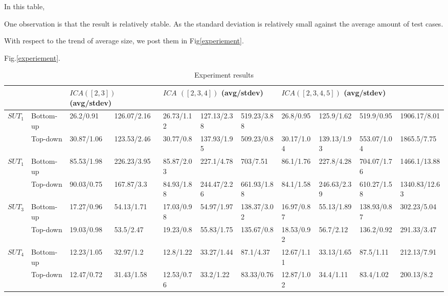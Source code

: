 \documentclass[conference]{IEEEtran}
\theoremstyle{definition}
\begin{document}
In this table, 


One observation is that the result is relatively stable. As the standard deviation is relatively small against the average amount of test cases.

With respect to the trend of average size, we post them in Fig\ref{experiement}.

 Fig.\ref{experiement}.

\begin{table}[h]
  \centering
  \caption{Experiment results}
  \label{experiment_table}
\begin{tabular}{|l|l|ll|lll|llll|}
\hline
\multicolumn{2}{|l|}{}            & \multicolumn{2}{l|}{$ICA([2, 3])$ (avg/stdev)}& \multicolumn{3}{l|}{$ICA$ $([2, 3,4])$ (avg/stdev)}    & \multicolumn{4}{l|}{$ICA([2, 3,4,5])$ (avg/stdev) }                   \\ \hline
\multirow{2}{*}{$SUT_{1}$} & Bottom-up & 26.2/0.91        & 126.07/2.16      & 26.73/1.12 & 127.13/2.38 & 519.23/3.88 & 26.8/0.95  & 125.9/1.62  & 519.9/0.95  & 1906.17/8.01  \\
                      & Top-down  & 30.87/1.06       & 123.53/2.46      & 30.77/0.8  & 137.93/1.95 & 509.23/0.8  & 30.17/1.04 & 139.13/1.93 & 553.07/1.04 & 1865.5/7.75   \\ \hline
\multirow{2}{*}{$SUT_{1}$} & Bottom-up & 85.53/1.98       & 226.23/3.95      & 85.87/2.03 & 227.1/4.78  & 703/7.51    & 86.1/1.76  & 227.8/4.28  & 704.07/1.76 & 1466.1/13.88  \\
                      & Top-down  & 90.03/0.75       & 167.87/3.3       & 84.93/1.88 & 244.47/2.26 & 661.93/1.88 & 84.1/1.58  & 246.63/2.39 & 610.27/1.58 & 1340.83/12.63 \\ \hline
\multirow{2}{*}{$SUT_{3}$} & Bottom-up & 17.27/0.96       & 54.13/1.71       & 17.03/0.98 & 54.97/1.97  & 138.37/3.02 & 16.97/0.87 & 55.13/1.89  & 138.93/0.87 & 302.23/5.04   \\
                      & Top-down  & 19.03/0.98       & 53.5/2.47        & 19.23/0.8  & 55.83/1.75  & 135.67/0.8  & 18.53/0.92 & 56.7/2.12   & 136.2/0.92  & 291.33/3.47   \\ \hline
\multirow{2}{*}{$SUT_{4}$} & Bottom-up & 12.23/1.05       & 32.97/1.2        & 12.8/1.22  & 33.27/1.44  & 87.1/4.37   & 12.67/1.11 & 33.13/1.65  & 87.5/1.11   & 212.13/7.91   \\
                      & Top-down  & 12.47/0.72       & 31.43/1.58       & 12.53/0.76 & 33.2/1.22   & 83.33/0.76  & 12.87/1.02 & 34.4/1.11   & 83.4/1.02   & 200.13/8.2    \\ \hline

\end{tabular}
\end{table}
\end{document}
